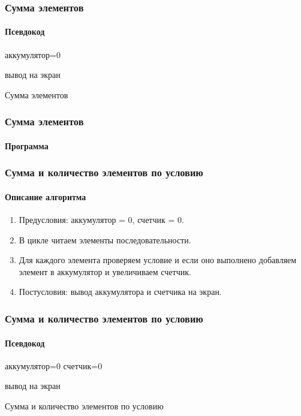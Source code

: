 \begin{frame}[fragile]
\frametitle{Сумма элементов}
\framesubtitle{Псевдокод}

\begin{algorithm}[H]
		\SetAlgoLined
		аккумулятор=0\;
		
	вывод на экран\;
	
	\caption{Сумма элементов}
\end{algorithm}


\end{frame}


\begin{frame}[fragile]
\frametitle{Сумма элементов}
\framesubtitle{Программа}



\end{frame}


\begin{frame}[fragile]
\frametitle{Сумма и количество элементов по условию}
\framesubtitle{Описание алгоритма}

\begin{enumerate}
	\item Предусловия: аккумулятор = 0, счетчик = 0.
	\item В цикле читаем элементы последовательности.
	\item Для каждого элемента проверяем условие и если оно выполнено добавляем элемент в аккумулятор и увеличиваем счетчик.
	\item Постусловия: вывод аккумулятора и счетчика на экран.
\end{enumerate}

\end{frame}

\begin{frame}[fragile]
\frametitle{Сумма и количество элементов по условию}
\framesubtitle{Псевдокод}

\begin{algorithm}[H]
		\SetAlgoLined
		аккумулятор=0\;
		счетчик=0\;
		
	вывод на экран\;
	
	\caption{Сумма и количество элементов по условию}
\end{algorithm}


\end{frame}

